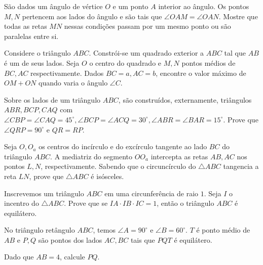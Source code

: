 \begin{questao}
  São dados um ângulo de vértice $O$ e um ponto $A$ interior ao
  ângulo. Os pontos $M,N$ pertencem aos lados do ângulo e são tais
  que $\angle OAM= \angle OAN$. Mostre que todas as retas $MN$
  nessas condições passam por um mesmo ponto ou são paralelas entre si.
\end{questao}

\begin{questao}
  Considere o triângulo $ABC$. Constrói-se um quadrado exterior a
  $ABC$ tal que $AB$ é um de seus lados. Seja $O$ o centro do
  quadrado e $M,N$ pontos médios de $BC,AC$ respectivamente. Dados
  $BC=a,AC=b$, encontre o valor máximo de $OM+ON$ quando varia o
  ângulo $\angle C$.
\end{questao}

\begin{questao}
  Sobre os lados de um triângulo $ABC$, são construídos,
  externamente, triângulos $ABR,BCP,CAQ$ com $\angle CBP = \angle CAQ
  = 45^\circ, \angle BCP = \angle ACQ = 30^\circ, \angle ABR = \angle
  BAR = 15^\circ$. Prove que $\angle QRP = 90^\circ$ e $QR=RP$.

\end{questao}

\begin{questao}
  Seja $O,O_a$ os centros do incírculo e do excírculo
  tangente ao lado $BC$ do triângulo $ABC$. A mediatriz do segmento
  $OO_a$ intercepta as retas $AB,AC$ nos pontos $L,N$,
  respectivamente. Sabendo que o circuncírculo do $\bigtriangleup ABC$
  tangencia a reta $LN$, prove que $\bigtriangleup ABC$ é isósceles.

\end{questao}

\begin{questao}
  Inscrevemos um triângulo $ABC$ em uma circunferência de
  raio $1$. Seja $I$ o incentro do $\bigtriangleup ABC$.
  Prove que se $IA \cdot IB \cdot IC = 1$, então o triângulo $ABC$ é
  equilátero.

\end{questao}

\begin{questao}
  No triângulo retângulo $ABC$, temos $\angle A=90^\circ$ e
  $\angle B=60^\circ$. $T$ é ponto médio de $AB$ e $P,Q$ são
  pontos dos lados $AC,BC$ tais que $PQT$ é equilátero.

  Dado que $AB=4$, calcule $PQ$.
\end{questao}

